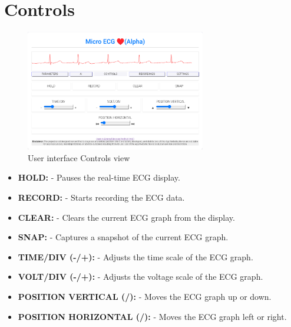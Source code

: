 \section{Controls}
\begin{figure}[H]
    \centering
    \includegraphics[width=0.7\textwidth]{images/ss/view-controls.png}
    \caption{User interface Controls view}
    \label{fig:ss_controls_view}
\end{figure}
\begin{itemize}[leftmargin=*]
    \item \textbf{HOLD:} -  Pauses the real-time ECG display.​
    \item \textbf{RECORD:} -  Starts recording the ECG data.​
    \item \textbf{CLEAR:} -  Clears the current ECG graph from the display.​
    \item \textbf{SNAP:} -  Captures a snapshot of the current ECG graph.​
    \item \textbf{TIME/DIV (-/+):} -  Adjusts the time scale of the ECG graph.​
    \item \textbf{VOLT/DIV (-/+):} -  Adjusts the voltage scale of the ECG graph.
    \item \textbf{POSITION VERTICAL (/):} -  Moves the ECG graph up or down.​
    \item \textbf{POSITION HORIZONTAL (\prevtrack/\nexttrack):} -  Moves the ECG graph left or right.​
\end{itemize}

